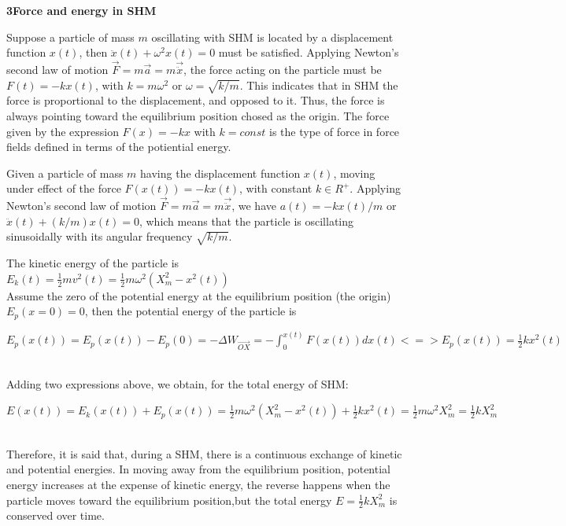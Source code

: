 \documentclass[a4paper,12pt,oneside]{report}
\newenvironment{tree}[4]{
\begin{list}{#1}{\parskip=0in \topsep=0in \itemsep=0in \parsep=0in \partopsep=0in \leftmargin=#2 \rightmargin=#3 \itemindent=#4 \listparindent=\itemindent}
}{\end{list}}
\newenvironment{ssection}[5]{
\phantom{#1}\textbf{#2\space#3}
\begin{tree}{#4}{0in}{0in}{#5}
}{\end{tree}}
\begin{document}
\begin{ssection}{\space}{3}{Force and energy in SHM}{\textbullet}{\parindent}
\item Suppose a particle of mass $m$ oscillating with SHM is located by a displacement function $x(t)$, then $\ddot{x}(t)+\omega^{2}x(t)=0$ must be satisfied. Applying Newton's second law of motion $\vec{F}=m\vec{a}=m\vec{\ddot{x}}$, the force acting on the particle must be $F(t)=-kx(t)$, with $k=m\omega^{2}$ or $\omega=\sqrt{k/m}$. This indicates that in SHM the force is proportional to the displacement, and opposed to it. Thus, the force is always pointing toward the equilibrium position chosed as the origin. The force given by the expression $F(x)=-kx$ with $k=const$ is the type of force in force fields defined in terms of the potiential energy.
\item Given a particle of mass $m$ having the displacement function $x(t)$, moving under effect of the force $F(x(t))=-kx(t)$, with constant $k\in R^{+}$. Applying Newton's second law of motion $\vec{F}=m\vec{a}=m\vec{\ddot{x}}$, we have $a(t)=-kx(t)/m$ or $\ddot{x}(t)+(k/m)x(t)=0$, which means that the particle is oscillating sinusoidally with its angular frequency $\sqrt{k/m}$.
\item The kinetic energy of the particle is $E_{k}(t)=\frac{1}{2}mv^{2}(t)=\frac{1}{2}m\omega^{2}(X_{m}^{2}-x^{2}(t))$\\
\indent Assume the zero of the potential energy at the equilibrium position (the origin) $E_{p}(x=0)=0$, then the potential energy of the particle is\\\centerline{$E_{p}(x(t))=E_{p}(x(t))-E_{p}(0)=\displaystyle-\Delta W_{\overrightarrow{OX}}=-\int_{0}^{x(t)}{F(x(t))dx(t)} <=> E_{p}(x(t))=\frac{1}{2}kx^{2}(t)$}\\
\indent Adding two expressions above, we obtain, for the total energy of SHM:\\\centerline{$E(x(t))=E_{k}(x(t))+E_{p}(x(t))=\frac{1}{2}m\omega^{2}(X_{m}^{2}-x^{2}(t))+\frac{1}{2}kx^{2}(t)=\frac{1}{2}m\omega^{2}X^{2}_{m}=\frac{1}{2}kX_{m}^{2}$}\\
\indent Therefore, it is said that, during a SHM, there is a continuous exchange of kinetic and potential energies. In moving away from the equilibrium position, potential energy increases at the expense of kinetic energy, the reverse happens when the particle moves toward the equilibrium position,but the total energy $E=\frac{1}{2}kX_{m}^{2}$ is conserved over time.
\end{ssection}\
\end{document}

